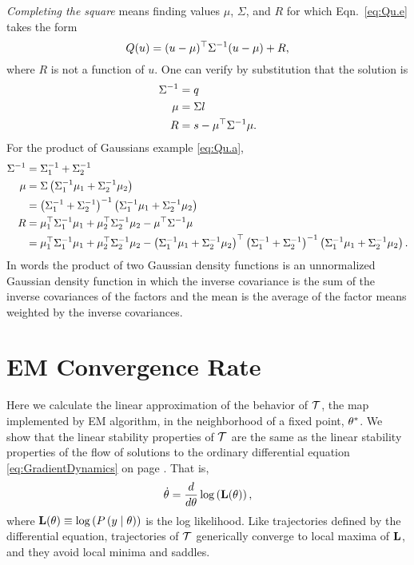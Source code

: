 \emph{Completing the square} means finding values $\mu$, $\Sigma$, and
$R$ for which Eqn.~\eqref{eq:Qu.e} takes the form
\begin{equation*}
  Q(u) = (u - \mu)^\top \Sigma^{-1} (u - \mu) + R,
\end{equation*}
where $R$ is not a function of $u$.  One can verify by substitution
that the solution is
\begin{align*}
  \Sigma^{-1} &= q\\
  \mu &= \Sigma l\\
  R &= s -  \mu^\top \Sigma^{-1} \mu.
\end{align*}
For the product of Gaussians example \eqref{eq:Qu.a},
\begin{subequations}
  \label{eq:GaussianProduct}
  \begin{align}
  \Sigma^{-1} &= \Sigma_1^{-1} + \Sigma_2^{-1} \\
  \mu &= \Sigma \left( \Sigma_1^{-1} \mu_1 + \Sigma_2^{-1} \mu_2
  \right) \\
  &= \left( \Sigma_1^{-1} + \Sigma_2^{-1} \right)^{-1} \left(
  \Sigma_1^{-1} \mu_1 + \Sigma_2^{-1} \mu_2  \right) \\
  R &= \mu_1^\top \Sigma_1^{-1} \mu_1 + \mu_2^\top
  \Sigma_2^{-1} \mu_2 -  \mu^\top \Sigma^{-1} \mu \\
  &= \mu_1^\top \Sigma_1^{-1} \mu_1 + \mu_2^\top
  \Sigma_2^{-1} \mu_2 - \left( \Sigma_1^{-1} \mu_1 + \Sigma_2^{-1}
  \mu_2  \right) ^\top \left( \Sigma_1^{-1} + \Sigma_2^{-1}
  \right)^{-1} \left( \Sigma_1^{-1} \mu_1 + \Sigma_2^{-1} \mu_2
  \right).
\end{align}
\end{subequations}
In words the product of two Gaussian density functions is an
unnormalized Gaussian density function in which the inverse covariance
is the sum of the inverse covariances of the factors and the mean is
the average of the factor means weighted by the inverse covariances.

\chapter{EM Convergence Rate}
\label{chap:em_appendix}

\newcommand{\OldParameters}{\parameters}
\newcommand{\NewParameters}{\parameters'} %
Here we calculate the linear approximation of the behavior of
$\EMmap$, the map implemented by EM algorithm, in the neighborhood of
a fixed point, ${\theta^*}$.  We show that the linear stability
properties of $\EMmap$ are the same as the linear stability properties
of the flow of solutions to the ordinary differential equation
\eqref{eq:GradientDynamics} on page \pageref{eq:GradientDynamics}.
That is,
\begin{equation*}
  \dot {\theta} = \frac{d}{d \theta} \log \left(
    {\bf L}(\theta) \right),
\end{equation*}
where ${\bf L}(\theta) \equiv \log \left( P \left( y \mid
    \theta \right) \right)$ is the log likelihood. Like trajectories
defined by the differential equation, trajectories of $\EMmap$
generically converge to local maxima of ${\bf L}$, and they
avoid local minima and saddles.

